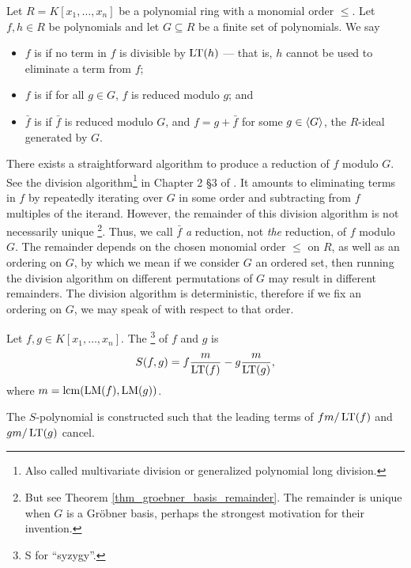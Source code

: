 \begin{definition}
  \label{def_reduced_polynomial}
  Let $R = K[x_1, \ldots, x_n]$ be a polynomial ring with a monomial order $\leq$.
  Let $f, h \in R$ be polynomials and let $G \subseteq R$ be a finite set of polynomials.
  We say
  \begin{itemize}
    \item $f$ is  if no term in $f$ is divisible by $\operatorname{LT}(h)$ ---
          that is, $h$ cannot be used to eliminate a term from $f$;
    \item $f$ is  if for all $g \in G$, $f$ is reduced modulo $g$; and
    \item $\bar f$ is  if $\bar f$ is reduced modulo $G$,
          and $f = g + \bar f$ for some $g \in \left\langle G \right\rangle$, the $R$-ideal generated by $G$.
  \end{itemize}
\end{definition}
There exists a straightforward algorithm to produce a reduction of $f$ modulo $G$.
See the division algorithm\footnote{Also called multivariate division or generalized polynomial long division.}
in Chapter 2 \S3 of \cite{cox07}.
It amounts to eliminating terms in $f$ by repeatedly iterating over $G$ in some order
and subtracting from $f$ multiples of the iterand.
However, the remainder of this division algorithm is not necessarily unique
\footnote{But see Theorem \ref{thm_groebner_basis_remainder}.
The remainder is unique when $G$ is a Gr\"obner basis, perhaps the strongest motivation for their invention.}.
Thus, we call $\bar f$ \emph{a} reduction, not \emph{the} reduction, of $f$ modulo $G$.
The remainder depends on the chosen monomial order $\leq$ on $R$, as well as an ordering on $G$,
by which we mean if we consider $G$ an ordered set, then running the division algorithm on different permutations of $G$
may result in different remainders.
The division algorithm is deterministic, therefore if we fix an ordering on $G$,
we may speak of  with respect to that order.

\begin{definition}
  Let $f, g \in K[x_1, \ldots, x_n]$. The \footnote{S for ``syzygy''.} of $f$ and $g$ is
  \[ S(f,g) = f \frac m {\operatorname{LT}(f)} - g \frac m {\operatorname{LT}(g)}, \]
  where $m = \operatorname{lcm}(\operatorname{LM}(f), \operatorname{LM}(g))$.
\end{definition}

The $S$-polynomial is constructed such that the leading terms of $f m / \operatorname{LT}(f)$ and $g m / \operatorname{LT}(g)$ cancel.

